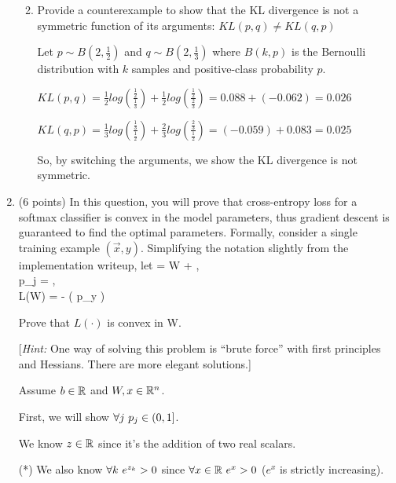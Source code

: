 \begin{enumerate}[resume]
\begin{enumerate}
\pagebreak
\item Provide a counterexample to show that the KL divergence is not a symmetric function of its arguments: $KL(p,q) \neq KL(q,p)$

Let $p \sim B(2, \frac{1}{2})$ and $q \sim B(2, \frac{1}{3})$ where $B(k, p)$ is the Bernoulli distribution with $k$ samples and positive-class probability $p$.

$KL(p, q) = \frac{1}{2}log(\frac{\frac{1}{2}}{\frac{1}{3}}) + \frac{1}{2}log(\frac{\frac{1}{2}}{\frac{2}{3}}) = 0.088 + (-0.062) = 0.026$

$KL(q, p) = \frac{1}{3}log(\frac{\frac{1}{3}}{\frac{1}{2}}) + \frac{2}{3}log(\frac{\frac{2}{3}}{\frac{1}{2}}) = (-0.059) + 0.083 = 0.025$

So, by switching the arguments, we show the KL divergence is not symmetric.

\end{enumerate}

\pagebreak
\item
(6 points) In this question, you will prove that cross-entropy loss for a softmax classifier is convex in the model parameters, thus gradient
descent is guaranteed to find the optimal parameters. Formally, consider a single training example $(\vec{x}, y)$.
Simplifying the notation slightly from the implementation writeup, let
\beqn
{} = W + , \\
p_j = , \\
L(W) = - \log \left( p_{y} \right)
\eeqn

Prove that $L(\cdot)$ is convex in W.

%

[\emph{Hint:} One way of solving this problem is ``brute force'' with first principles and Hessians. There are more elegant solutions.]

Assume $b \in \mathbb{R}$ and $W, x \in \mathbb{R}^n$.

First, we will show $\forall j \thinspace\thinspace p_j \in (0, 1]$.

We know $z \in \mathbb{R}$ since it's the addition of two real scalars.

(*) We also know $\forall k \thinspace\thinspace e^{z_k} > 0$ since $\forall x\in\mathbb{R} \thinspace\thinspace e^x > 0$ ($e^x$ is strictly increasing).


\end{enumerate}
